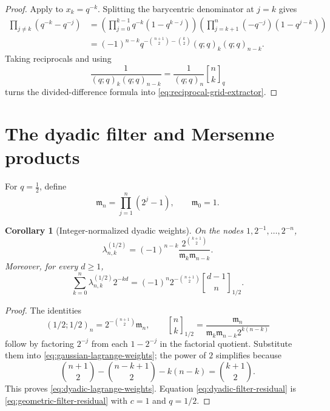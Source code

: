 \documentclass[11pt,oneside,openany]{book}
\newtheorem{corollary}[theorem]{Corollary}
\theoremstyle{definition}
\theoremstyle{remark}
\newcommand{\qbinom}[2]{\genfrac{[}{]}{0pt}{}{#1}{#2}_{q}}
\newcommand{\Qbinom}[3]{\genfrac{[}{]}{0pt}{}{#1}{#2}_{#3}}
\begin{document}
\begin{proof}
Apply  to $x_k=q^{-k}$.  Splitting the barycentric denominator at $j=k$ gives
\begin{align*}
 \prod_{j\ne k}(q^{-k}-q^{-j})
 &=\left(\prod_{j=0}^{k-1}q^{-k}(1-q^{k-j})\right)
   \left(\prod_{j=k+1}^{n}(-q^{-j})(1-q^{j-k})\right)\\
 &=(-1)^{n-k}q^{-\binom{n+1}{2}-\binom k2}
   (q;q)_k(q;q)_{n-k}.
\end{align*}
Taking reciprocals and using
\[
 \frac1{(q;q)_k(q;q)_{n-k}}=\frac1{(q;q)_n}\qbinom nk
\]
turns the divided-difference formula into \eqref{eq:reciprocal-grid-extractor}.
\end{proof}

\section{The dyadic filter and Mersenne products}

For $q=\tfrac12$, define
\begin{equation}
 \mathfrak m_n=\prod_{j=1}^n(2^j-1),\qquad \mathfrak m_0=1.\label{eq:mersenne-product-filter}
\end{equation}

\begin{corollary}[Integer-normalized dyadic weights]\label{cor:dyadic-lagrange-weights}
On the nodes $1,2^{-1},\ldots,2^{-n}$,
\begin{equation}
 \lambda_{n,k}^{(1/2)}
 =(-1)^{n-k}\frac{2^{\binom{k+1}{2}}}
 {\mathfrak m_k\mathfrak m_{n-k}}.\label{eq:dyadic-lagrange-weights}
\end{equation}
Moreover, for every $d\ge1$,
\begin{equation}
 \sum_{k=0}^n\lambda_{n,k}^{(1/2)}2^{-kd}
 =(-1)^n2^{-\binom{n+1}{2}}
 \Qbinom{d-1}n{1/2}.\label{eq:dyadic-filter-residual}
\end{equation}
\end{corollary}

\begin{proof}
The identities
\[
 (1/2;1/2)_n=2^{-\binom{n+1}{2}}\mathfrak m_n,
 \qquad
 \Qbinom nk{1/2}
 =\frac{\mathfrak m_n}
 {\mathfrak m_k\mathfrak m_{n-k}2^{k(n-k)}}
\]
follow by factoring $2^{-j}$ from each $1-2^{-j}$ in the factorial quotient.  Substitute them into \eqref{eq:gaussian-lagrange-weights}; the power of $2$ simplifies because
\[
 \binom{n+1}{2}-\binom{n-k+1}{2}-k(n-k)=\binom{k+1}{2}.
\]
This proves \eqref{eq:dyadic-lagrange-weights}.  Equation \eqref{eq:dyadic-filter-residual} is \eqref{eq:geometric-filter-residual} with $c=1$ and $q=1/2$.
\end{proof}
\end{document}

